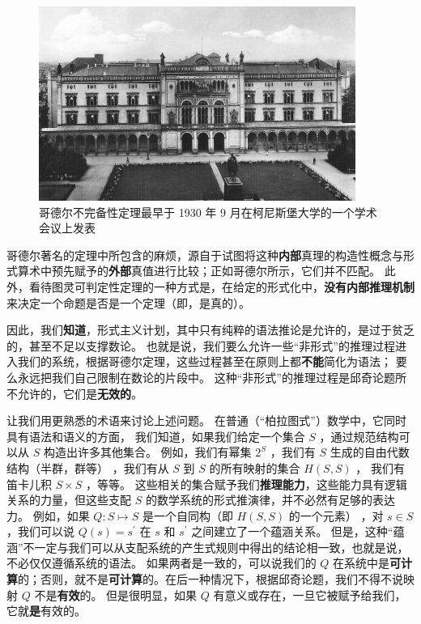 \documentclass[a4paper,12pt]{article}
\begin{document}
\begin{figure}[ht]
\centering
\includegraphics[height=2.5in]{images/konigsberger_university.jpg}
\caption{哥德尔不完备性定理最早于 1930 年 9 月在柯尼斯堡大学的一个学术会议上发表}
\end{figure}

哥德尔著名的定理\cite{GodelK1931}中所包含的麻烦，源自于试图将这种\textbf{内部}真理的构造性概念与\gls{形式算术}中预先赋予的\textbf{外部}真值进行比较；正如哥德尔所示，它们并不匹配。
此外，看待图灵可判定性定理\cite{TuringA1937}的一种方式是，在给定的\gls{形式化}中，\textbf{没有内部\gls{推理机制}}来决定一个\gls{命题}是否是一个定理（即，是真的）。

因此，我们\textbf{知道}，\gls{形式主义}计划，其中只有纯粹的\gls{语法}推论是允许的，是过于贫乏的，甚至不足以支撑数论。
也就是说，我们要么允许一些“非形式”的\gls{推理过程}进入我们的系统，根据哥德尔定理，这些过程甚至在原则上都\textbf{不能}简化为\gls{语法}； 要么永远把我们自己限制在数论的片段中。
这种“非形式”的\gls{推理过程}是\gls{邱奇论题}所不允许的，它们是\textbf{无效的}。

让我们用更熟悉的术语来讨论上述问题。 在普通（“柏拉图式”）数学中，它同时具有\gls{语法}和\gls{语义}的方面，
我们知道，如果我们给定一个集合 $S$ ，通过规范结构可以从 $S$ 构造出许多其他集合。
例如，我们有幂集 $2^S$ ，我们有 $S$ \gls{生成}的自由代数结构（半群，群等） ，我们有从 $S$ 到 $S$ 的所有映射的集合 $H(S, S)$ ，
我们有笛卡儿积 $S \times S$ ，等等。
这些相关的集合赋予我们\textbf{\gls{推理能力}}，这些能力具有\gls{逻辑关系}的力量，但这些支配 $S$ 的数学系统的形式推演律，并不必然有足够的表达力。
例如，如果 $Q: S \mapsto S$ 是一个自同构（即 $H(S, S)$ 的一个元素） ，对 $s \in S $，我们可以说 $Q(s) = s^{\prime}$ 在 $s$ 和 $s^{\prime}$ 之间建立了一个\gls{蕴涵关系}。
但是，这种“\gls{蕴涵}”不一定与我们可以从支配系统的产生式规则中得出的结论相一致，也就是说，不必仅仅遵循系统的\gls{语法}。
如果两者是一致的，可以说我们的 $Q$ 在系统中是\textbf{\gls{可计算}}的；否则，就不是\textbf{可计算}的。在后一种情况下，根据\gls{邱奇论题}，我们不得不说映射 $Q$ 不是\textbf{有效}的。
但是很明显，如果 $Q$ 有意义或存在，一旦它被赋予给我们，它就\textbf{是}有效的。
\end{document}
